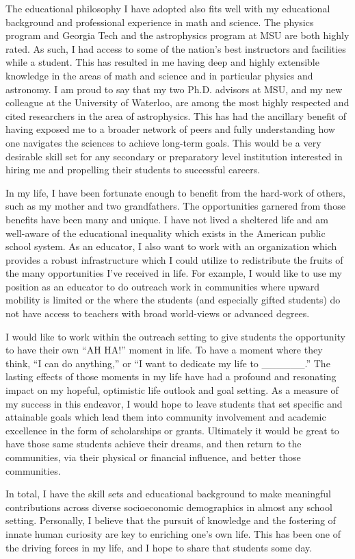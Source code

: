 \documentclass[11pt]{article}
\begin{document}
The educational philosophy I have adopted also fits well with my
educational background and professional experience in math and
science. The physics program and Georgia Tech and the astrophysics
program at MSU are both highly rated. As such, I had access to some of
the nation's best instructors and facilities while a student. This has
resulted in me having deep and highly extensible knowledge in the
areas of math and science and in particular physics and astronomy. I
am proud to say that my two Ph.D. advisors at MSU, and my new
colleague at the University of Waterloo, are among the most highly
respected and cited researchers in the area of astrophysics. This has
had the ancillary benefit of having exposed me to a broader network of
peers and fully understanding how one navigates the sciences to
achieve long-term goals. This would be a very desirable skill set for
any secondary or preparatory level institution interested in hiring me
and propelling their students to successful careers.

In my life, I have been fortunate enough to benefit from the hard-work
of others, such as my mother and two grandfathers. The opportunities
garnered from those benefits have been many and unique. I have not
lived a sheltered life and am well-aware of the educational inequality
which exists in the American public school system. As an educator, I
also want to work with an organization which provides a robust
infrastructure which I could utilize to redistribute the fruits of the
many opportunities I've received in life. For example, I would like to
use my position as an educator to do outreach work in communities
where upward mobility is limited or the where the students (and
especially gifted students) do not have access to teachers with broad
world-views or advanced degrees.

I would like to work within the outreach setting to give students the
opportunity to have their own ``AH HA!''  moment in life. To have a
moment where they think, ``I can do anything,'' or ``I want to
dedicate my life to \_\_\_\_\_\_.'' The lasting effects of those
moments in my life have had a profound and resonating impact on my
hopeful, optimistic life outlook and goal setting. As a measure of my
success in this endeavor, I would hope to leave students that set
specific and attainable goals which lead them into community
involvement and academic excellence in the form of scholarships or
grants. Ultimately it would be great to have those same students
achieve their dreams, and then return to the communities, via their
physical or financial influence, and better those communities.

In total, I have the skill sets and educational background to make
meaningful contributions across diverse socioeconomic demographics in
almost any school setting. Personally, I believe that the pursuit of
knowledge and the fostering of innate human curiosity are key to
enriching one's own life. This has been one of the driving forces in
my life, and I hope to share that students some day.
\end{document}
